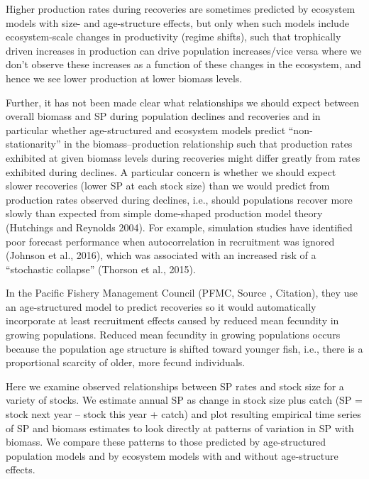 \documentclass[12pt,doublespacing,a4paper]{ouparticle}
\begin{document}
Higher production rates during recoveries are sometimes predicted by ecosystem models with size- and age-structure effects, but only when such models include ecosystem-scale changes in productivity (regime shifts), such that trophically driven increases in production can drive population increases/vice versa where we don't observe these increases as a function of these changes in the ecosystem, and hence we see lower production at lower biomass levels. 

Further, it has not been made clear what relationships we should expect between overall biomass and SP during population declines and recoveries and in particular whether age-structured and ecosystem models predict “non-stationarity” in the biomass–production relationship such that production rates exhibited at given biomass levels during recoveries might differ greatly from rates exhibited during declines. A particular concern is whether we should expect slower recoveries (lower SP at each stock size) than we would predict from production rates observed during declines, i.e., should populations recover more slowly than expected from simple dome-shaped production model theory (Hutchings and Reynolds 2004). For example, simulation studies have identified poor forecast performance when autocorrelation in recruitment was ignored (Johnson et al., 2016), which was associated with an increased risk of a “stochastic collapse” (Thorson et al., 2015).

In the Pacific Fishery Management Council (PFMC, Source , Citation), they use an age-structured model to predict recoveries so it would automatically incorporate at least recruitment effects caused by reduced mean fecundity in growing populations. Reduced mean fecundity in growing populations occurs because the population age structure is shifted toward younger fish, i.e., there is a proportional scarcity of older, more fecund individuals.

Here we examine observed relationships between SP rates and stock size for a variety of stocks. We estimate annual SP as change in stock size plus catch (SP = stock next year – stock this year + catch) and plot resulting empirical time series of SP and biomass estimates to look directly at patterns of variation in SP with biomass. We compare these patterns to those predicted by age-structured population models and by ecosystem models with and without age-structure effects. 
\end{document}

